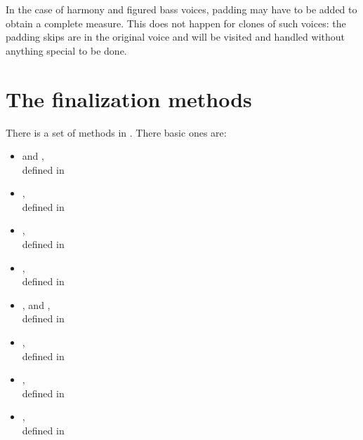 In the case of harmony and figured bass voices, padding may have to be added to obtain a complete measure. This does not happen for clones of such voices: the padding skips are in the original voice and will be visited and handled without anything special to be done.


\section{The finalization methods}

There is a set of  methods in \mf. There basic ones are:
\begin{itemize}
\item {} and ,\\
		  defined in 
\item {},\\
		  defined in 
\item {},\\
		  defined in \\[-0.5ex]

\item {},\\
		  defined in \\[-0.5ex]

\item {},  and ,\\
		  defined in \\[-0.5ex]

\item {},\\
		  defined in \\[-0.5ex]

\item {},\\
		  defined in 
\item {}, \\
      defined in \\[-0.5ex]


\end{itemize}
